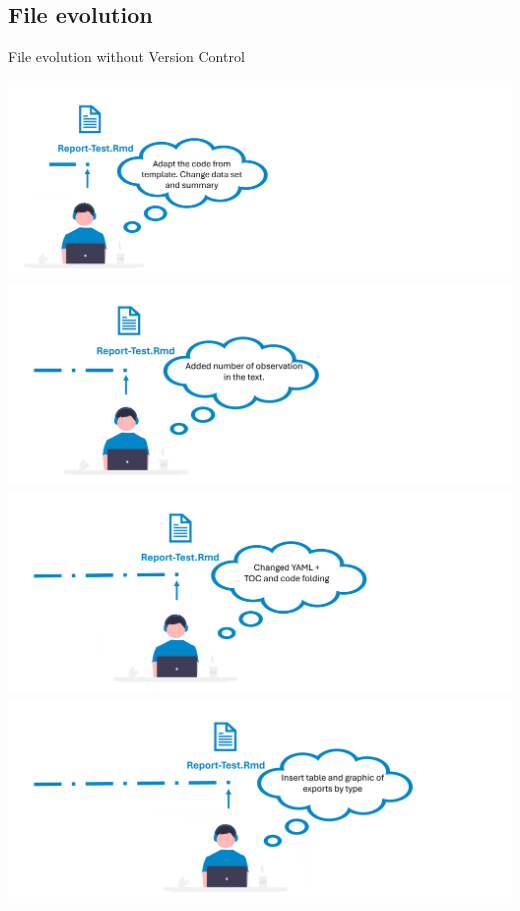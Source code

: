 \documentclass[xcolor=x11names,compress, aspectratio=169]{beamer}
\renewcommand{\(}{\begin{columns}}
\renewcommand{\)}{\end{columns}}
\newcommand{\<}[1]{\begin{column}{#1}}
\renewcommand{\>}{\end{column}}
\begin{document}
\subsection{File evolution}

\begin{frame}{File evolution  \textcolor{brique}{without Version Control}  }
\begin{center}
\begin{itemize}
    {\includegraphics[width = 1.0\textwidth]{FileChange1a.png} \\ }
    {\includegraphics[width = 1.0\textwidth]{FileChange2a.png} \\ }
    {\includegraphics[width = 1.0\textwidth]{FileChange3a.png} \\ }
    {\includegraphics[width = 1.0\textwidth]{FileChange4a.png} \\ }

\end{itemize}
\end{center}
\end{frame}
\end{document}

